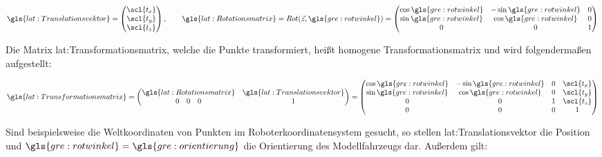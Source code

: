 \begin{equation}
\gls{lat:Translationsvektor} = 
\begin{pmatrix}
\scl{t_x} 	\\
\scl{t_y} 	\\
\scl{t_z}     	\\
\end{pmatrix}
, \qquad
\gls{lat:Rotationsmatrix} = Rot(\vec{z},\gls{gre:rotwinkel}) = 
\begin{pmatrix}
\cos{\gls{gre:rotwinkel}} & -\sin{\gls{gre:rotwinkel}} & {0} 	\\
\sin{\gls{gre:rotwinkel}} & \cos{\gls{gre:rotwinkel}} & {0} 	\\
{0} & {0} & {1} 				    	\\
\end{pmatrix}
\end{equation} 		


Die Matrix \gls{lat:Transformationsmatrix}, welche die Punkte  transformiert, heißt homogene Transformationsmatrix und wird folgendermaßen aufgestellt:

\begin{equation}
\gls{lat:Transformationsmatrix} = 
\begin{pmatrix}
\gls{lat:Rotationsmatrix} &  \gls{lat:Translationsvektor}	\\
0 \quad 0 \quad 0 & 1 	\\
\end{pmatrix}
=
\begin{pmatrix}
\cos{\gls{gre:rotwinkel}} & -\sin{\gls{gre:rotwinkel}} & {0} & \scl{t_x} 	\\
\sin{\gls{gre:rotwinkel}} & \cos{\gls{gre:rotwinkel}} & {0} & \scl{t_y} 	\\
{0} & {0} & {1} & \scl{t_z} 				    	\\
0 & 0 & 0 & 1 						\\
\end{pmatrix}
\end{equation}

Sind beispielsweise die Weltkoordinaten von Punkten im Roboterkoordinatensystem gesucht, so stellen \gls{lat:Translationsvektor} die Position und \( \gls{gre:rotwinkel} = \gls{gre:orientierung} \) die Orientierung des Modellfahrzeugs dar. Außerdem gilt: 

